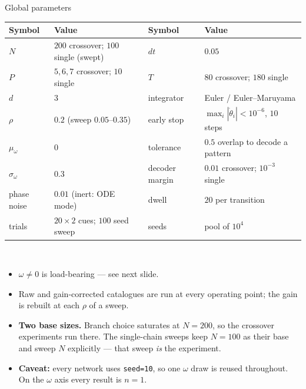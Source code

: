 \documentclass[aspectratio=169]{beamer}
\newcommand{\thetavar}{\theta}
\begin{document}
\begin{frame}{Global parameters}
  \centering
  \footnotesize
  \begin{tabular}{llll}
    \toprule
    Symbol & Value & Symbol & Value \\
    \midrule
    $N$             & $200$ crossover; $100$ single (swept) & $dt$          & $0.05$ \\
    $P$             & $5,6,7$ crossover; $10$ single      & $T$             & $80$ crossover; $180$ single \\
    $d$             & $3$                                 & integrator      & Euler / Euler--Maruyama \\
    $\rho$          & $0.2$ (sweep $0.05$--$0.35$)        & early stop      & $\max_i|\dot\thetavar_i| < 10^{-6}$, $10$ steps \\
    $\mu_\omega$    & $0$                                 & tolerance       & $0.5$ overlap to decode a pattern \\
    $\sigma_\omega$ & $0.3$                               & decoder margin  & $0.01$ crossover; $10^{-3}$ single \\
    phase noise     & $0.01$ (inert: ODE mode)            & dwell           & $20$ per transition \\
    trials          & $20 \times 2$ cues; $100$ seed sweep & seeds          & pool of $10^4$ \\
    \bottomrule
  \end{tabular}
  \\[3mm]
  \begin{itemize}
    \item $\omega \neq 0$ is load-bearing --- see next slide.
    \item Raw and gain-corrected catalogues are run at every operating point;
      the gain is rebuilt at each $\rho$ of a sweep.
    \item \textbf{Two base sizes.} Branch choice saturates at $N = 200$, so the crossover
      experiments run there. The single-chain sweeps keep $N = 100$ as their base and sweep
      $N$ explicitly --- that sweep \emph{is} the experiment.
    \item \textbf{Caveat:} every network uses \texttt{seed=10}, so one $\omega$
      draw is reused throughout. On the $\omega$ axis every result is $n = 1$.
  \end{itemize}
\end{frame}
\end{document}
